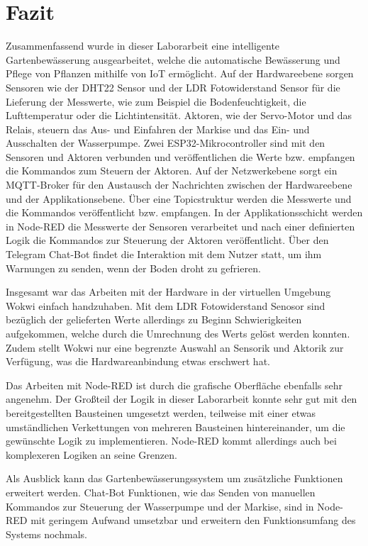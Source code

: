 
\section{Fazit}
Zusammenfassend wurde in dieser Laborarbeit eine intelligente Gartenbewässerung ausgearbeitet, welche die automatische Bewässerung und Pflege von Pflanzen mithilfe von IoT ermöglicht. Auf der Hardwareebene sorgen Sensoren wie der DHT22 Sensor und der LDR Fotowiderstand Sensor für die Lieferung der Messwerte, wie zum Beispiel die Bodenfeuchtigkeit, die Lufttemperatur oder die Lichtintensität. Aktoren, wie der Servo-Motor und das Relais, steuern das Aus- und Einfahren der Markise und das Ein- und Ausschalten der Wasserpumpe. Zwei ESP32-Mikrocontroller sind mit den Sensoren und Aktoren verbunden und veröffentlichen die Werte bzw. empfangen die Kommandos zum Steuern der Aktoren. Auf der Netzwerkebene sorgt ein MQTT-Broker für den Austausch der Nachrichten zwischen der Hardwareebene und der Applikationsebene. Über eine Topicstruktur werden die Messwerte und die Kommandos veröffentlicht bzw. empfangen. In der Applikationsschicht werden in Node-RED die Messwerte der Sensoren verarbeitet und nach einer definierten Logik die Kommandos zur Steuerung der Aktoren veröffentlicht. Über den Telegram Chat-Bot findet die Interaktion mit dem Nutzer statt, um ihm Warnungen zu senden, wenn der Boden droht zu gefrieren.

Insgesamt war das Arbeiten mit der Hardware in der virtuellen Umgebung Wokwi einfach handzuhaben. Mit dem LDR Fotowiderstand Senosor sind bezüglich der gelieferten Werte allerdings zu Beginn Schwierigkeiten aufgekommen, welche durch die Umrechnung des Werts gelöst werden konnten. Zudem stellt Wokwi nur eine begrenzte Auswahl an Sensorik und Aktorik zur Verfügung, was die Hardwareanbindung etwas erschwert hat.

Das Arbeiten mit Node-RED ist durch die grafische Oberfläche ebenfalls sehr angenehm. Der Großteil der Logik in dieser Laborarbeit konnte sehr gut mit den bereitgestellten Bausteinen umgesetzt werden, teilweise mit einer etwas umständlichen Verkettungen von mehreren Bausteinen hintereinander, um die gewünschte Logik zu implementieren. Node-RED kommt allerdings auch bei komplexeren Logiken an seine Grenzen.

Als Ausblick kann das Gartenbewässerungssystem um zusätzliche Funktionen erweitert werden. Chat-Bot Funktionen, wie das Senden von manuellen Kommandos zur Steuerung der Wasserpumpe und der Markise, sind in Node-RED mit geringem Aufwand umsetzbar und erweitern den Funktionsumfang des Systems nochmals.